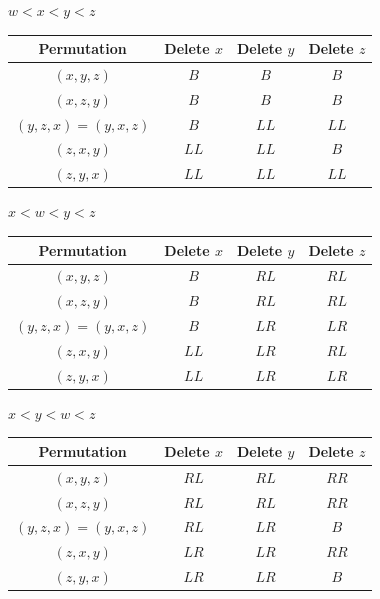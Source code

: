\documentclass{beamer}
\begin{document}
\begin{frame}
    $w < x < y < z$
    \begin{center}
        \begin{tabular}{||c c c c||} 
            \hline
            Permutation& Delete $x$& Delete $y$ & Delete $z$ \\ [0.5ex] 
            \hline\hline
            $(x,y,z)$ & $B$ & $B$ & $B$ \\ 
            \hline
            $(x,z,y)$ & $B$ & $B$ & $B$ \\ 
            \hline
            $(y,z,x) = (y,x,z)$ & $B$ & $LL$ & $LL$\\ 
            \hline
            $(z,x,y)$ & $LL$ & $LL$ & $B$\\ 
            \hline
            $(z,y,x)$ & $LL$ & $LL$ & $LL$ \\ 
            \hline
        \end{tabular}
    \end{center}
\end{frame}

\begin{frame}
    $x < w < y < z$
    \begin{center}
        \begin{tabular}{||c c c c||} 
            \hline
            Permutation& Delete $x$& Delete $y$ & Delete $z$ \\ [0.5ex] 
            \hline\hline
            $(x,y,z)$ & $B$ & $RL$ & $RL$ \\ 
            \hline
            $(x,z,y)$ & $B$ & $RL$ & $RL$ \\ 
            \hline
            $(y,z,x) = (y,x,z)$ & $B$ & $LR$ & $LR$\\ 
            \hline
            $(z,x,y)$ & $LL$ & $LR$ & $RL$\\ 
            \hline
            $(z,y,x)$ & $LL$ & $LR$ & $LR$ \\ 
            \hline
        \end{tabular}
    \end{center}
\end{frame}

\begin{frame}
    $x < y < w < z$
    \begin{center}
        \begin{tabular}{||c c c c||} 
            \hline
            Permutation& Delete $x$& Delete $y$ & Delete $z$ \\ [0.5ex] 
            \hline\hline
            $(x,y,z)$ & $RL$ & $RL$ & $RR$ \\ 
            \hline
            $(x,z,y)$ & $RL$ & $RL$ & $RR$ \\  
            \hline
            $(y,z,x) = (y,x,z)$ & $RL$ & $LR$ & $B$\\ 
            \hline
            $(z,x,y)$ & $LR$ & $LR$ & $RR$\\ 
            \hline
            $(z,y,x)$ & $LR$ & $LR$ & $B$ \\ 
            \hline
        \end{tabular}
    \end{center}
\end{frame}
\end{document}

